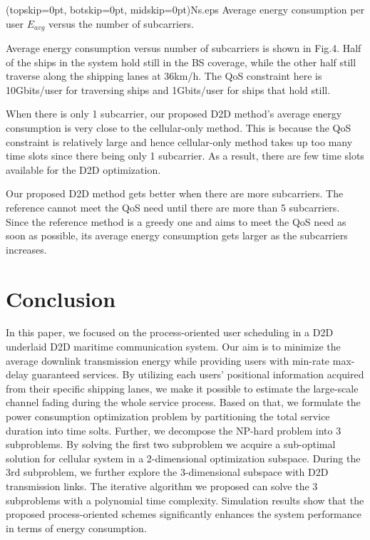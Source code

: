 \documentclass{ieeeaccess}
\begin{document}

\Figure[t!](topskip=0pt, botskip=0pt, midskip=0pt){Ns.eps}
{Average energy consumption per user $E_{avg}$ versus the number of subcarriers.\label{fig4}}



Average energy consumption versus number of subcarriers is shown in Fig.4. Half of the ships in the system hold still in the BS coverage, while the other half still traverse along the shipping lanes at 36km/h. The QoS constraint here is 10Gbits/user for traversing ships and 1Gbits/user for ships that hold still.

When there is only 1 subcarrier, our proposed D2D method's average energy consumption is very close to the cellular-only method. This is because the QoS constraint is relatively large and hence cellular-only method takes up too many time slots since there being only 1 subcarrier. As a result, there are few time slots available for the D2D optimization.

Our proposed D2D method gets better when there are more subcarriers. The reference cannot meet the QoS need until there are more than 5 subcarriers. Since the reference method is a greedy one and aims to meet the QoS need as soon as possible, its average energy consumption gets larger as the subcarriers increases.


\section{Conclusion}\label{sec:4}

In this paper, we focused on the process-oriented user scheduling in a D2D underlaid D2D maritime communication system. Our aim is to minimize the average downlink transmission energy while providing users with min-rate max-delay guaranteed services. By utilizing each users' positional information acquired from their specific shipping lanes, we make it possible to estimate the large-scale channel fading during the whole service process. Based on that, we formulate the power consumption optimization problem by partitioning the total service duration into time solts. Further, we decompose the NP-hard problem into 3 subproblems. By solving the first two subproblem we acquire a sub-optimal solution for cellular system in a 2-dimensional optimization subspace. During the 3rd subproblem, we further explore the 3-dimensional subspace with D2D transmission links. The iterative algorithm we proposed can solve the 3 subproblems with a polynomial time complexity. Simulation results show that the proposed process-oriented schemes significantly enhances the system performance in terms of energy consumption.
\end{document}
